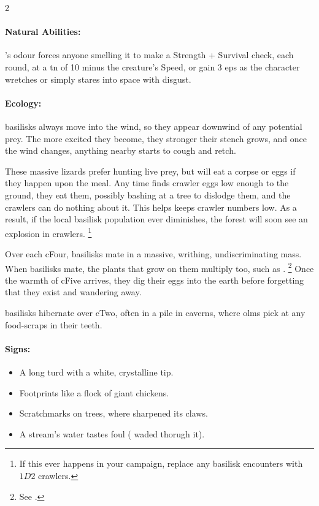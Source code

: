 \begin{multicols}{2}
\basilisk

\paragraph{Natural Abilities:} 's odour forces anyone smelling it to make a Strength + Survival check, each round, at a \gls{tn} of 10 minus the creature's Speed, or gain 3 \glspl{ep} as the character wretches or simply stares into space with disgust.

\paragraph{Ecology:}
\Glspl{basilisk} always move into the wind, so they appear downwind of any potential prey.
The more excited they become, they stronger their stench grows, and once the wind changes, anything nearby starts to cough and retch.

These massive lizards prefer hunting live prey, but will eat a corpse or eggs if they happen upon the meal.
Any time  finds \gls{crawler} eggs low enough to the ground, they eat them, possibly bashing at a tree to dislodge them, and the \glspl{crawler} can do nothing about it.
This helps keeps crawler numbers low.
As a result, if the local \gls{basilisk} population ever diminishes, the forest will soon see an explosion in \glspl{crawler}.%
\footnote{If this ever happens in your campaign, replace any \gls{basilisk} encounters with $1D2$ \glspl{crawler}.}

Over each \gls{cFour}, \glspl{basilisk} mate in a massive, writhing, undiscriminating mass.
When \glspl{basilisk} mate, the plants that grow on them multiply too, such as .%
\footnote{See .}
Once the warmth of \gls{cFive} arrives, they dig their eggs into the earth before forgetting that they exist and wandering away.

\Glspl{basilisk} hibernate over \gls{cTwo}, often in a pile in caverns, where \glspl{olm} pick at any food-scraps in their teeth.

\paragraph{Signs:}

\begin{itemize}
  \item
  A long turd with a white, crystalline tip.
  \item
  Footprints like a flock of giant chickens.
  \item
  Scratchmarks on trees, where  sharpened its claws.
  \item
  A stream's water tastes foul ( waded thorugh it).
\end{itemize}


\end{multicols}
